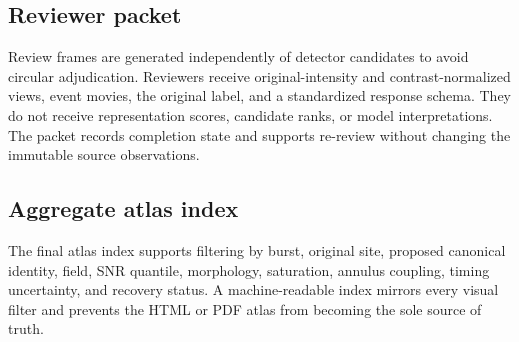 \subsection{Reviewer packet}

Review frames are generated independently of detector candidates to avoid circular adjudication. Reviewers receive original-intensity and contrast-normalized views, event movies, the original label, and a standardized response schema. They do not receive representation scores, candidate ranks, or model interpretations. The packet records completion state and supports re-review without changing the immutable source observations.

\subsection{Aggregate atlas index}

The final atlas index supports filtering by burst, original site, proposed canonical identity, field, SNR quantile, morphology, saturation, annulus coupling, timing uncertainty, and recovery status. A machine-readable index mirrors every visual filter and prevents the HTML or PDF atlas from becoming the sole source of truth.
